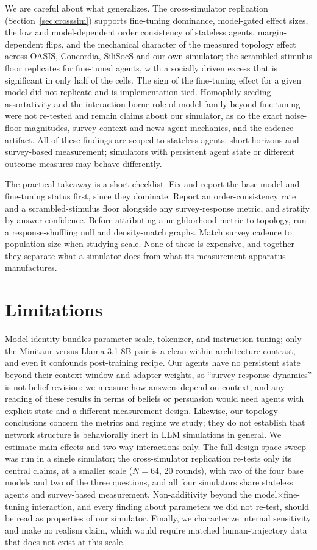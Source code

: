 \documentclass[letterpaper]{article} %
\begin{document}
We are careful about what generalizes. The cross-simulator replication (Section~\ref{sec:crosssim}) supports fine-tuning dominance, model-gated effect sizes, the low and model-dependent order consistency of stateless agents, margin-dependent flips, and the mechanical character of the measured topology effect across OASIS, Concordia, SiliSocS and our own simulator; the scrambled-stimulus floor replicates for fine-tuned agents, with a socially driven excess that is significant in only half of the cells. The sign of the fine-tuning effect for a given model did not replicate and is implementation-tied. Homophily seeding assortativity and the interaction-borne role of model family beyond fine-tuning were not re-tested and remain claims about our simulator, as do the exact noise-floor magnitudes, survey-context and news-agent mechanics, and the cadence artifact. All of these findings are scoped to stateless agents, short horizons and survey-based measurement; simulators with persistent agent state or different outcome measures may behave differently.

The practical takeaway is a short checklist. Fix and report the base model and fine-tuning status first, since they dominate. Report an order-consistency rate and a scrambled-stimulus floor alongside any survey-response metric, and stratify by answer confidence. Before attributing a neighborhood metric to topology, run a response-shuffling null and density-match graphs. Match survey cadence to population size when studying scale. None of these is expensive, and together they separate what a simulator does from what its measurement apparatus manufactures.


\section{Limitations}


Model identity bundles parameter scale, tokenizer, and instruction tuning; only the Minitaur-versus-Llama-3.1-8B pair is a clean within-architecture contrast, and even it confounds post-training recipe. Our agents have no persistent state beyond their context window and adapter weights, so ``survey-response dynamics'' is not belief revision: we measure how answers depend on context, and any reading of these results in terms of beliefs or persuasion would need agents with explicit state and a different measurement design. Likewise, our topology conclusions concern the metrics and regime we study; they do not establish that network structure is behaviorally inert in LLM simulations in general. We estimate main effects and two-way interactions only. The full design-space sweep was run in a single simulator; the cross-simulator replication re-tests only its central claims, at a smaller scale ($N{=}64$, 20 rounds), with two of the four base models and two of the three questions, and all four simulators share stateless agents and survey-based measurement. Non-additivity beyond the model$\times$fine-tuning interaction, and every finding about parameters we did not re-test, should be read as properties of our simulator. Finally, we characterize internal sensitivity and make no realism claim, which would require matched human-trajectory data that does not exist at this scale.
\end{document}
